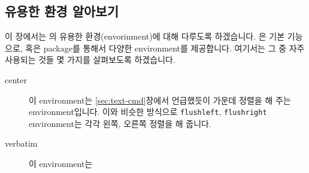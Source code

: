 \subsection{유용한 환경 알아보기}
\label{sec:advanced-environment}
이 장에서는 \lt 의 유용한 환경(envorinment)에 대해 다루도록 하겠습니다. \lt 은 기본 기능으로, 혹은 package를 통해서 다양한 environment를 제공합니다. 여기서는 그 중 자주 사용되는 것들 몇 가지를 살펴보도록 하겠습니다.
\begin{description}
\item[center] 이 environment는 \ref{sec:text-cmd}장에서 언급했듯이 가운데 정렬을 해 주는 environment입니다. 이와 비슷한 방식으로 \verb|flushleft|, \verb|flushright| environment는 각각 왼쪽, 오른쪽 정렬을 해 줍니다.
\item[verbatim] 이 environment는 


\end{description}






